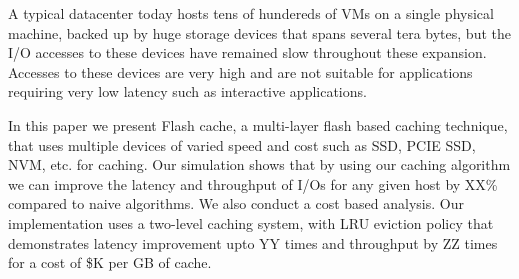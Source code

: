 A typical datacenter today hosts tens of hundereds of VMs on a single physical machine, backed up by huge storage devices that spans several tera bytes, but the I/O accesses to these devices have remained slow throughout these expansion. Accesses to these devices are very high and are not suitable for applications requiring very low latency such as interactive applications.

In this paper we present Flash cache, a multi-layer flash based caching technique, that uses multiple devices of varied speed and cost such as SSD, PCIE SSD, NVM, etc. for caching. Our simulation shows that by using our caching algorithm we can improve the latency and throughput of I/Os for any given host by XX\% compared to naive algorithms. We also conduct a cost based analysis. Our implementation uses a two-level caching system, with LRU eviction policy that demonstrates latency improvement upto YY times and throughput by ZZ times for a cost of \$K per GB of cache. 
